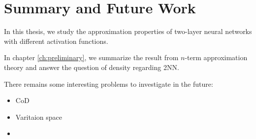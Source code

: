 \chapter{Summary and Future Work}

In this thesis, we study the approximation properties of two-layer neural
networks with different activation functions.

In chapter \ref{ch:preliminary}, we summarize the result from $n$-term approximation
theory and answer the question of density regarding 2NN. 


There remains some interesting problems to investigate in the future:

\begin{itemize}
    \item CoD
    \item Varitaion space
    \item 
\end{itemize}


